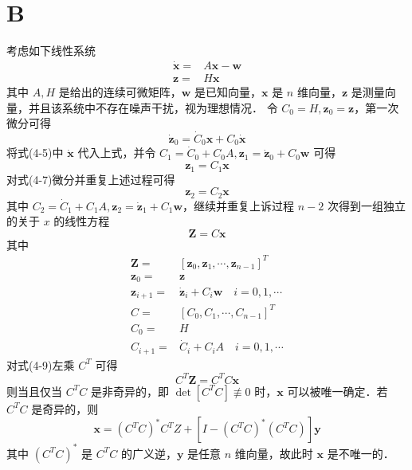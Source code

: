 \section*{B}
考虑如下线性系统
\begin{equation}
	\begin{split}
		\dot{\bm{x}} =& A\bm{x} - \bm{w} \\
		\bm{z} =& H \bm{x}
	\end{split}	
\end{equation}
其中 $A,H$ 是给出的连续可微矩阵，$\bm{w}$ 是已知向量，$\bm{x}$ 是 $n$ 维向量，$\bm{z}$ 是测量向量，并且该系统中不存在噪声干扰，视为理想情况．
令 $C_0 = H, \bm{z}_0 = \bm{z}$，第一次微分可得
\begin{equation}
	\dot{\bm{z}}_0 = \dot{C}_0\bm{x} + C_0\dot{\bm{x}}
\end{equation}
将式(4-5)中 $\dot{\bm{x}}$ 代入上式，并令 $C_1=\dot{C}_0 + C_0A,\bm{z}_1=\dot{\bm{z}}_0 + C_0\bm{w}$ 可得
\begin{equation}
	\bm{z}_1 = C_1 \bm{x}
\end{equation}
对式(4-7)微分并重复上述过程可得
\begin{equation}
	\bm{z}_2 = C_2 \bm{x}
\end{equation}
其中 $C_2 = \dot{C}_1 + C_1 A,\bm{z}_2 = \dot{\bm{z}}_1 + C_1\bm{w}$，继续并重复上诉过程 $n-2$ 次得到一组独立的关于 $x$ 的线性方程
\begin{equation}
	\bm{Z} = C\bm{x}
\end{equation}
其中
\begin{equation}
	\begin{split}
		\bm{Z} =& [\bm{z}_0,\bm{z}_1,\cdots,\bm{z}_{n-1}]^T \\
		\bm{z}_0 =& \bm{z} \\
		\bm{z}_{i+1} =& \dot{\bm{z}}_{i} + C_i\bm{w} \quad i=0,1,\cdots\\
		C =& [C_0,C_1,\cdots,C_{n-1}]^T \\
		C_0 =& H \\
		C_{i+1} =& \dot{C}_i + C_i A \quad i=0,1,\cdots
	\end{split}
\end{equation}
对式(4-9)左乘 $C^T$ 可得
\begin{equation}
	C^T\bm{Z} = C^TC \bm{x}
\end{equation}
则当且仅当 $C^TC$ 是非奇异的，即 $\det[C^TC] \not \equiv 0$ 时，$\bm{x}$ 可以被唯一确定．若 $C^TC$ 是奇异的，则
\begin{equation}
	\bm{x} = (C^TC)^*C^T Z + [I- (C^TC)^* (C^TC)]\bm{y}
\end{equation}
其中 $(C^TC)^*$ 是 $C^TC$ 的广义逆，$\bm{y}$ 是任意 $n$ 维向量，故此时 $\bm{x}$ 是不唯一的．

